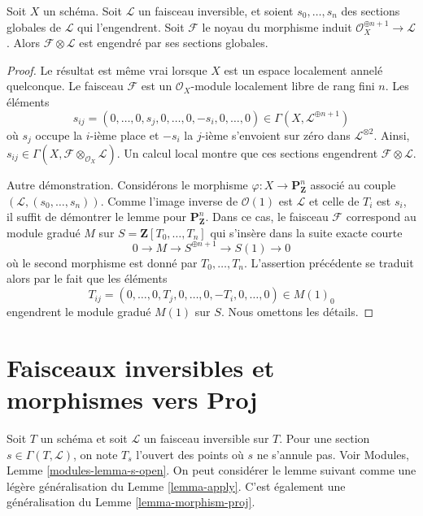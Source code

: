 \begin{lemma}
\label{lemma-globally-generated-omega-twist-1}
Soit $X$ un schéma. Soit $\mathcal{L}$ un faisceau inversible, et soient
$s_0, \ldots, s_n$ des sections globales de $\mathcal{L}$ qui l'engendrent.
Soit $\mathcal{F}$ le noyau du morphisme induit
$\mathcal{O}_X^{\oplus n + 1} \to \mathcal{L}$. Alors
$\mathcal{F} \otimes \mathcal{L}$ est engendré par ses sections globales.
\end{lemma}

\begin{proof}
Le résultat est même vrai lorsque $X$ est un espace localement annelé
quelconque. Le faisceau $\mathcal{F}$ est un $\mathcal{O}_X$-module localement
libre de rang fini $n$. Les éléments
$$
s_{ij} = (0, \ldots, 0, s_j, 0, \ldots, 0, -s_i, 0, \ldots, 0)
\in \Gamma(X, \mathcal{L}^{\oplus n + 1})
$$
où $s_j$ occupe la $i$-ième place et $-s_i$ la $j$-ième s'envoient sur zéro
dans $\mathcal{L}^{\otimes 2}$. Ainsi,
$s_{ij} \in \Gamma(X, \mathcal{F} \otimes_{\mathcal{O}_X} \mathcal{L})$.
Un calcul local montre que ces sections engendrent
$\mathcal{F} \otimes \mathcal{L}$.

\medskip\noindent
Autre démonstration. Considérons le morphisme
$\varphi : X \to \mathbf{P}^n_\mathbf{Z}$ associé au couple
$(\mathcal{L}, (s_0, \ldots, s_n))$. Comme l'image inverse de
$\mathcal{O}(1)$ est $\mathcal{L}$ et celle de $T_i$ est $s_i$, il suffit de
démontrer le lemme pour $\mathbf{P}^n_\mathbf{Z}$. Dans ce cas, le faisceau
$\mathcal{F}$ correspond au module gradué $M$ sur
$S = \mathbf{Z}[T_0, \ldots, T_n]$ qui s'insère dans la suite exacte courte
$$
0 \to M \to S^{\oplus n + 1} \to S(1) \to 0
$$
où le second morphisme est donné par $T_0, \ldots, T_n$.
L'assertion précédente se traduit alors par le fait que les éléments
$$
T_{ij} = (0, \ldots, 0, T_j, 0, \ldots, 0, -T_i, 0, \ldots, 0)
\in M(1)_0
$$
engendrent le module gradué $M(1)$ sur $S$. Nous omettons les détails.
\end{proof}


\section{Faisceaux inversibles et morphismes vers Proj}
\label{section-invertible-proj}

\noindent
Soit $T$ un schéma et soit $\mathcal{L}$ un faisceau inversible sur $T$.
Pour une section $s \in \Gamma(T, \mathcal{L})$, on note $T_s$ l'ouvert
des points où $s$ ne s'annule pas. Voir Modules,
Lemme \ref{modules-lemma-s-open}. On peut considérer le lemme suivant comme
une légère généralisation du Lemme \ref{lemma-apply}. C'est également une
généralisation du Lemme \ref{lemma-morphism-proj}.

